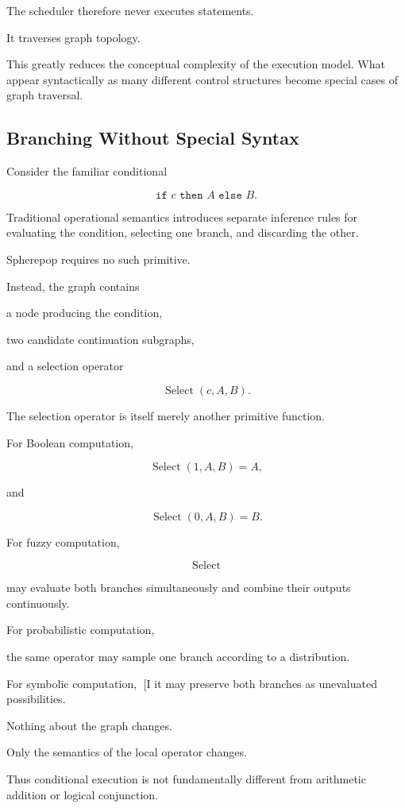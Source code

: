 \documentclass[12pt,oneside]{article}
\begin{document}
The scheduler therefore never executes statements.

It traverses graph topology.

This greatly reduces the conceptual complexity of the execution model. What appear syntactically as many different control structures become special cases of graph traversal.

\subsection{Branching Without Special Syntax}

Consider the familiar conditional

\[
\texttt{if }c\texttt{ then }A\texttt{ else }B.
\]

Traditional operational semantics introduces separate inference rules for evaluating the condition, selecting one branch, and discarding the other.

Spherepop requires no such primitive.

Instead, the graph contains

a node producing the condition,

two candidate continuation subgraphs,

and a selection operator

\[
\operatorname{Select}(c,A,B).
\]

The selection operator is itself merely another primitive function.

For Boolean computation,

\[
\operatorname{Select}(1,A,B)=A,
\]

and

\[
\operatorname{Select}(0,A,B)=B.
\]

For fuzzy computation,

\[
\operatorname{Select}
\]

may evaluate both branches simultaneously and combine their outputs continuously.

For probabilistic computation,

the same operator may sample one branch according to a distribution.

For symbolic computation,
[I
it may preserve both branches as unevaluated possibilities.

Nothing about the graph changes.

Only the semantics of the local operator changes.

Thus conditional execution is not fundamentally different from arithmetic addition or logical conjunction.
\end{document}
